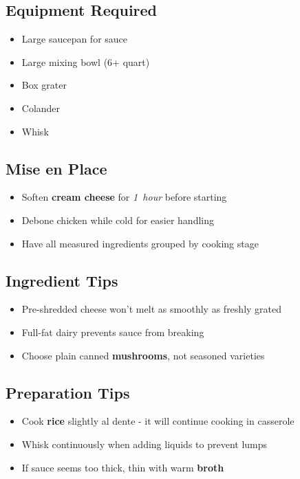 \documentclass[11pt,letterpaper]{article}
\begin{document}
{\small
\setlength{\columnsep}{20pt}
\setlength{\multicolsep}{6pt}
\begin{multicols}{2}
\setlength{\parindent}{0pt}
\setlength{\parskip}{4pt}

\subsection*{Equipment Required}
\begin{itemize}
    \item Large saucepan for sauce
    \item Large mixing bowl (6+ quart)
    \item Box grater
    \item Colander
    \item Whisk
\end{itemize}

\subsection*{Mise en Place}
\begin{itemize}
    \item Soften \textbf{cream cheese} for \textit{1~hour} before starting
    \item Debone chicken while cold for easier handling
    \item Have all measured ingredients grouped by cooking stage
\end{itemize}

\subsection*{Ingredient Tips}
\begin{itemize}
    \item Pre-shredded cheese won't melt as smoothly as freshly grated
    \item Full-fat dairy prevents sauce from breaking
    \item Choose plain canned \textbf{mushrooms}, not seasoned varieties
\end{itemize}

\subsection*{Preparation Tips}
\begin{itemize}
    \item Cook \textbf{rice} slightly al dente - it will continue cooking in casserole
    \item Whisk continuously when adding liquids to prevent lumps
    \item If sauce seems too thick, thin with warm \textbf{broth}
\end{itemize}


\end{multicols}}
\end{document}
